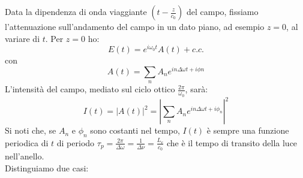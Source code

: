 \documentclass{book}
\def \D {\Delta}
\theoremstyle{remark}
\begin{document}
Data la dipendenza di onda viaggiante $(t -\frac{z}{c_0})$ del campo, fissiamo l'attenuazione sull'andamento del campo in un dato piano, ad esempio $z=0$, al variare di $t$. Per $z=0$ ho:
\begin{equation*}
E(t) = e^{i\omega_0t} A(t) + c.c.
\end{equation*}
con
\begin{equation*}
A(t) = \sum_n A_n e^{in\D \omega t + i\phi n}
\end{equation*}
L'intensità del campo, mediato sul ciclo ottico $\frac{2\pi}{\omega_0}$, sarà:
\begin{equation*}
I(t) = |A(t)|^2 = \left| \sum_n A_n e^{in\D\omega t + i\phi_n} \right|^2
\end{equation*}
Si noti che, se $A_n$ e $\phi_n$ sono costanti nel tempo, $I(t)$ è sempre una funzione periodica di $t$ di periodo $\tau_p = \frac{2\pi}{\D\omega} = \frac{1}{\D\nu} = \frac{L_e}{c_0}$ che è il tempo di transito della luce nell'anello.\\
Distinguiamo due casi:
\end{document}
